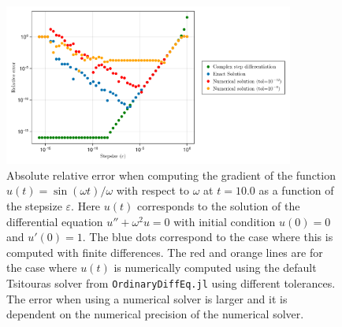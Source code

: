 \begin{figure}[tbh]
    \centering
    \includegraphics[width=0.85\textwidth]{../code/finite_differences/finite_difference_derivative.pdf}
    \caption{Absolute relative error when computing the gradient of the function $u(t) = \sin (\omega t)/\omega$ with respect to $\omega$ at $t=10.0$ as a function of the stepsize $\varepsilon$. Here $u(t)$ corresponds to the solution of the differential equation $u'' + \omega^2 u = 0$ with initial condition $u(0)=0$ and $u'(0)=1$. The blue dots correspond to the case where this is computed with finite differences. The red and orange lines are for the case where $u(t)$ is numerically computed using the default Tsitouras solver \cite{Tsitouras_2011} from \texttt{OrdinaryDiffEq.jl} using different tolerances. The error when using a numerical solver is larger and it is dependent on the numerical precision of the numerical solver. }
    \label{fig:finite-diff}
\end{figure}


